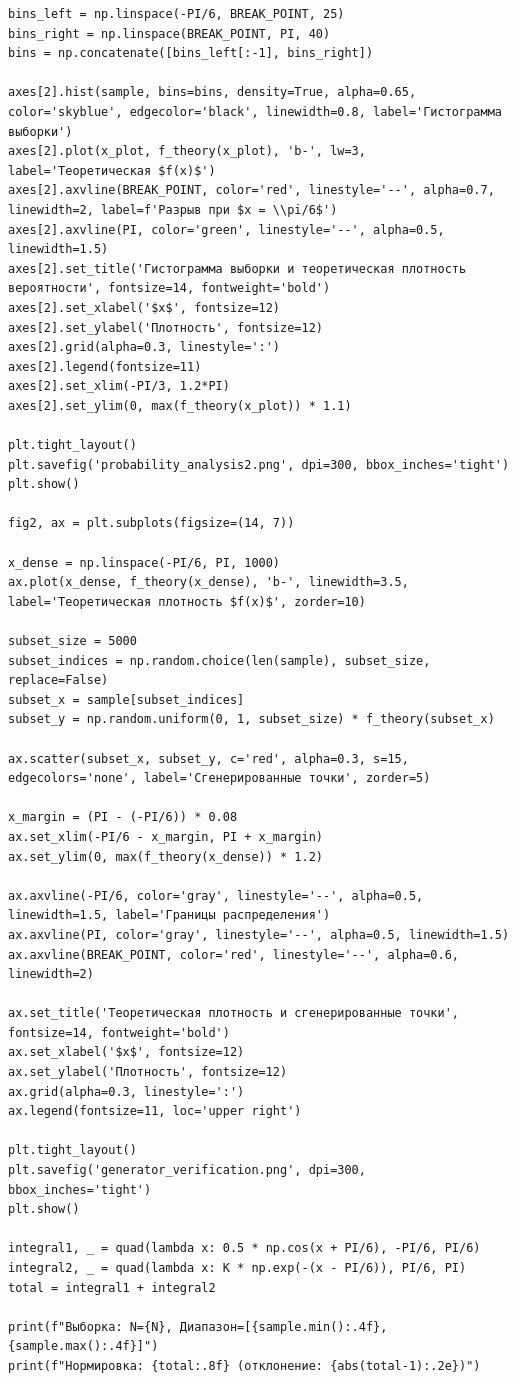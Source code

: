 \documentclass[12pt,a4paper]{article}
\begin{document}
\begin{lstlisting}[caption={Программа генерации выборки и построения графиков},label=lst:code]
bins_left = np.linspace(-PI/6, BREAK_POINT, 25)
bins_right = np.linspace(BREAK_POINT, PI, 40)
bins = np.concatenate([bins_left[:-1], bins_right])

axes[2].hist(sample, bins=bins, density=True, alpha=0.65, color='skyblue', edgecolor='black', linewidth=0.8, label='Гистограмма выборки')
axes[2].plot(x_plot, f_theory(x_plot), 'b-', lw=3, label='Теоретическая $f(x)$')
axes[2].axvline(BREAK_POINT, color='red', linestyle='--', alpha=0.7, linewidth=2, label=f'Разрыв при $x = \\pi/6$')
axes[2].axvline(PI, color='green', linestyle='--', alpha=0.5, linewidth=1.5)
axes[2].set_title('Гистограмма выборки и теоретическая плотность вероятности', fontsize=14, fontweight='bold')
axes[2].set_xlabel('$x$', fontsize=12)
axes[2].set_ylabel('Плотность', fontsize=12)
axes[2].grid(alpha=0.3, linestyle=':')
axes[2].legend(fontsize=11)
axes[2].set_xlim(-PI/3, 1.2*PI)
axes[2].set_ylim(0, max(f_theory(x_plot)) * 1.1)

plt.tight_layout()
plt.savefig('probability_analysis2.png', dpi=300, bbox_inches='tight')
plt.show()

fig2, ax = plt.subplots(figsize=(14, 7))

x_dense = np.linspace(-PI/6, PI, 1000)
ax.plot(x_dense, f_theory(x_dense), 'b-', linewidth=3.5, label='Теоретическая плотность $f(x)$', zorder=10)

subset_size = 5000
subset_indices = np.random.choice(len(sample), subset_size, replace=False)
subset_x = sample[subset_indices]
subset_y = np.random.uniform(0, 1, subset_size) * f_theory(subset_x)

ax.scatter(subset_x, subset_y, c='red', alpha=0.3, s=15, edgecolors='none', label='Сгенерированные точки', zorder=5)

x_margin = (PI - (-PI/6)) * 0.08
ax.set_xlim(-PI/6 - x_margin, PI + x_margin)
ax.set_ylim(0, max(f_theory(x_dense)) * 1.2)

ax.axvline(-PI/6, color='gray', linestyle='--', alpha=0.5, linewidth=1.5, label='Границы распределения')
ax.axvline(PI, color='gray', linestyle='--', alpha=0.5, linewidth=1.5)
ax.axvline(BREAK_POINT, color='red', linestyle='--', alpha=0.6, linewidth=2)

ax.set_title('Теоретическая плотность и сгенерированные точки', fontsize=14, fontweight='bold')
ax.set_xlabel('$x$', fontsize=12)
ax.set_ylabel('Плотность', fontsize=12)
ax.grid(alpha=0.3, linestyle=':')
ax.legend(fontsize=11, loc='upper right')

plt.tight_layout()
plt.savefig('generator_verification.png', dpi=300, bbox_inches='tight')
plt.show()

integral1, _ = quad(lambda x: 0.5 * np.cos(x + PI/6), -PI/6, PI/6)
integral2, _ = quad(lambda x: K * np.exp(-(x - PI/6)), PI/6, PI)
total = integral1 + integral2

print(f"Выборка: N={N}, Диапазон=[{sample.min():.4f}, {sample.max():.4f}]")
print(f"Нормировка: {total:.8f} (отклонение: {abs(total-1):.2e})")
\end{lstlisting}
\end{document}

